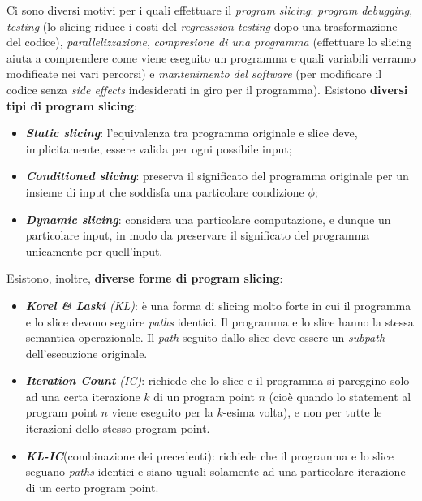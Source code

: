 \documentclass{article}
\begin{document}
            Ci sono diversi motivi per i quali effettuare il \textit{program slicing}: \textit{program debugging}, \textit{testing} (lo slicing riduce i costi del \textit{regresssion testing} dopo una trasformazione del codice), \textit{parallelizzazione},	\textit{compresione di una programma} (effettuare lo slicing aiuta a comprendere come viene eseguito un programma e quali variabili verranno modificate nei vari percorsi) e \textit{mantenimento del software} (per modificare il codice senza \textit{side effects} indesiderati in giro per il programma).
            \newline
            \newline
            \noindent
            Esistono \textbf{diversi tipi di program slicing}:
            \begin{itemize}
                \item \textit{\textbf{Static slicing}}: l'equivalenza tra programma originale e slice deve, implicitamente, essere valida per ogni possibile input;
                \item \textit{\textbf{Conditioned slicing}}: preserva il significato del programma originale per un insieme di input che soddisfa una particolare condizione $\phi$;
                \item \textit{\textbf{Dynamic slicing}}: considera una particolare computazione, e dunque un particolare input, in modo da preservare il significato del programma unicamente per quell'input.
            \end{itemize}

            \noindent
            Esistono, inoltre, \textbf{diverse forme di program slicing}:
            \begin{itemize}
                \item \textit{\textbf{Korel \& Laski} (KL)}: è una forma di slicing molto forte in cui il programma e lo slice devono seguire \textit{paths} identici. Il programma e lo slice hanno la stessa semantica operazionale. Il \textit{path} seguito dallo slice deve essere un \textit{subpath} dell'esecuzione originale.
                \item \textit{\textbf{Iteration Count} (IC)}: richiede che lo slice e il programma si pareggino solo ad una certa iterazione $k$ di un program point $n$ (cioè quando lo statement al program point $n$ viene eseguito per la $k$-esima volta), e non per tutte le iterazioni dello stesso program point.
                \item \textit{\textbf{KL-IC}}(combinazione dei precedenti): richiede che il programma e lo slice seguano \textit{paths} identici e siano uguali solamente ad una particolare iterazione di un certo program point.
            \end{itemize}
\end{document}
